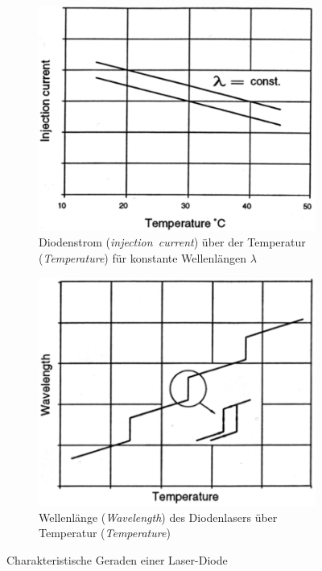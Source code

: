 \documentclass[numbers=noenddot,12pt,a4paper]{scrartcl}
\newcommand{\tilt}[1]{\mbox{\textit{#1}}}
\begin{document}
\begin{figure}[H]
	\begin{subfigure}[htbp]{0.45\textwidth}
		\includegraphics[width=\textwidth]{stromT.png}
		\caption{Diodenstrom (\tilt{injection current}) über der Temperatur (\tilt{Temperature}) für konstante Wellenlängen $\lambda$}\label{img:stromt}
	\end{subfigure}
	\hspace{0.5cm}
	\begin{subfigure}[htbp]{0.45\textwidth}
			\vspace{-0.9cm}
		\includegraphics[width=\textwidth]{lambdaT.png}
		\caption{Wellenlänge (\tilt{Wavelength}) des Diodenlasers über Temperatur (\tilt{Temperature})}\label{img:lambdat}
	\end{subfigure}
	\caption{Charakteristische Geraden einer Laser-Diode}
	\label{img:diodechar}
\end{figure}
\end{document}
